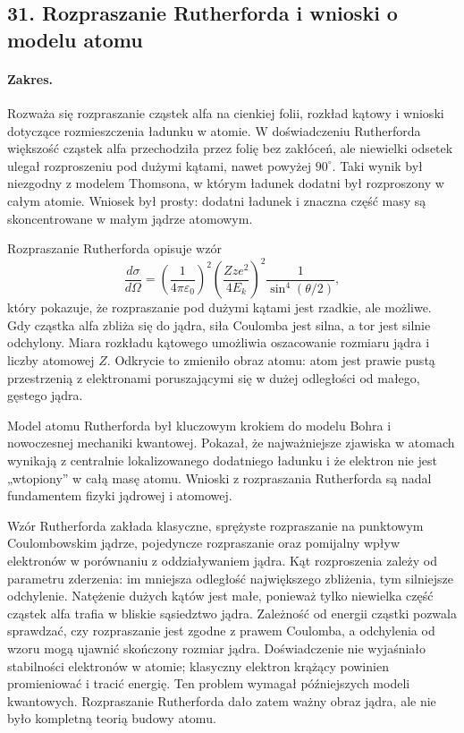 \documentclass[11pt,a4paper]{article}
\begin{document}
\subsection{31. Rozpraszanie Rutherforda i wnioski o modelu atomu}
\paragraph{Zakres.} Rozważa się rozpraszanie cząstek alfa na cienkiej folii, rozkład kątowy i wnioski dotyczące rozmieszczenia ładunku w atomie. W doświadczeniu Rutherforda większość cząstek alfa przechodziła przez folię bez zakłóceń, ale niewielki odsetek ulegał rozproszeniu pod dużymi kątami, nawet powyżej $90^\circ$. Taki wynik był niezgodny z modelem Thomsona, w którym ładunek dodatni był rozproszony w całym atomie. Wniosek był prosty: dodatni ładunek i znaczna część masy są skoncentrowane w małym jądrze atomowym.\par
Rozpraszanie Rutherforda opisuje wzór
\[
\frac{d\sigma}{d\Omega}=\left(\frac{1}{4\pi\varepsilon_0}\right)^2\left(\frac{Zze^2}{4E_k}\right)^2\frac{1}{\sin^4(\theta/2)},
\]
który pokazuje, że rozpraszanie pod dużymi kątami jest rzadkie, ale możliwe. Gdy cząstka alfa zbliża się do jądra, siła Coulomba jest silna, a tor jest silnie odchylony. Miara rozkładu kątowego umożliwia oszacowanie rozmiaru jądra i liczby atomowej $Z$. Odkrycie to zmieniło obraz atomu: atom jest prawie pustą przestrzenią z elektronami poruszającymi się w dużej odległości od małego, gęstego jądra.\par
Model atomu Rutherforda był kluczowym krokiem do modelu Bohra i nowoczesnej mechaniki kwantowej. Pokazał, że najważniejsze zjawiska w atomach wynikają z centralnie lokalizowanego dodatniego ładunku i że elektron nie jest „wtopiony” w całą masę atomu. Wnioski z rozpraszania Rutherforda są nadal fundamentem fizyki jądrowej i atomowej.\par

Wzór Rutherforda zakłada klasyczne, sprężyste rozpraszanie na punktowym Coulombowskim jądrze, pojedyncze rozpraszanie oraz pomijalny wpływ elektronów w porównaniu z oddziaływaniem jądra. Kąt rozproszenia zależy od parametru zderzenia: im mniejsza odległość największego zbliżenia, tym silniejsze odchylenie. Natężenie dużych kątów jest małe, ponieważ tylko niewielka część cząstek alfa trafia w bliskie sąsiedztwo jądra. Zależność od energii cząstki pozwala sprawdzać, czy rozpraszanie jest zgodne z prawem Coulomba, a odchylenia od wzoru mogą ujawnić skończony rozmiar jądra. Doświadczenie nie wyjaśniało stabilności elektronów w atomie; klasyczny elektron krążący powinien promieniować i tracić energię. Ten problem wymagał późniejszych modeli kwantowych. Rozpraszanie Rutherforda dało zatem ważny obraz jądra, ale nie było kompletną teorią budowy atomu.
\par
\end{document}

